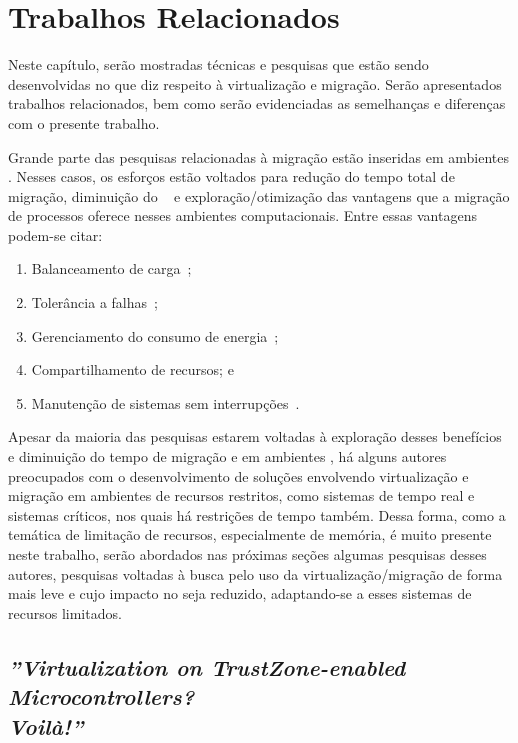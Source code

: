 \glsresetall
\chapter{Trabalhos Relacionados}
\label{chap.related-work}

Neste capítulo, serão mostradas técnicas e pesquisas que estão sendo desenvolvidas no que diz respeito à virtualização e migração. Serão apresentados trabalhos relacionados, bem como serão evidenciadas as semelhanças e diferenças com o presente trabalho.

Grande parte das pesquisas relacionadas à migração estão inseridas em ambientes \cloud. Nesses casos, os esforços estão voltados para redução do tempo total de migração, diminuição do \downtime~\cite{migration-linux-conteiners,clark2005live} e exploração/otimização das vantagens que a migração de processos oferece nesses ambientes computacionais. Entre essas vantagens podem-se citar:
\begin{enumerate}[label=(\roman*)]
    \item Balanceamento de carga~\cite{live-vm-migration-techniques,ada-things};
    \item Tolerância a falhas~\cite{fernando2019live};
    \item Gerenciamento do consumo de energia~\cite{aldossary2018performance};
    \item Compartilhamento de recursos; e
    \item Manutenção de sistemas sem interrupções~\cite{live-vm-migration-techniques,ada-things}.
\end{enumerate}

Apesar da maioria das pesquisas estarem voltadas à exploração desses benefícios e diminuição do tempo de migração e \downtime em ambientes \cloud, há alguns autores preocupados com o desenvolvimento de soluções envolvendo virtualização e migração em ambientes de recursos restritos, como sistemas de tempo real e sistemas críticos, nos quais há restrições de tempo também. Dessa forma, como a temática de limitação de recursos, especialmente de memória, é muito presente neste trabalho, serão abordados nas próximas seções algumas pesquisas desses autores, \ie pesquisas voltadas à busca pelo uso da virtualização/migração de forma mais leve e cujo impacto no \hardware seja reduzido, adaptando-se a esses sistemas de recursos limitados.

\section{\textit{''Virtualization on TrustZone-enabled Microcontrollers?\\ Voilà!''}}\label{sec.rw-1}

